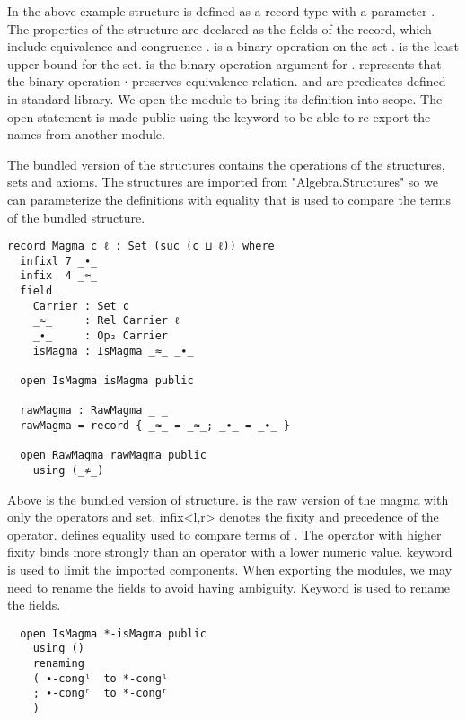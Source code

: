 In the above example structure  is defined as a record type with
a parameter . The properties of the structure  are
declared as the fields of the record, which include equivalence
 and congruence .  is a binary
operation on the set .  is the least upper bound for the
set.  is the binary operation argument for .
 represents that the binary operation ∙ preserves
equivalence relation.  and  are
predicates defined in standard library. We open the module
 to bring its definition into scope. The open statement is
made public using the keyword  to be able to re-export the names
from another module.

The bundled version of the structures contains the operations of the structures,
sets and axioms. The structures are imported from "Algebra.Structures" so we can
parameterize the definitions with equality that is used to compare the terms of
the bundled structure.

\begin{verbatim}
record Magma c ℓ : Set (suc (c ⊔ ℓ)) where
  infixl 7 _∙_
  infix  4 _≈_
  field
    Carrier : Set c
    _≈_     : Rel Carrier ℓ
    _∙_     : Op₂ Carrier
    isMagma : IsMagma _≈_ _∙_

  open IsMagma isMagma public

  rawMagma : RawMagma _ _
  rawMagma = record { _≈_ = _≈_; _∙_ = _∙_ }

  open RawMagma rawMagma public
    using (_≉_)
\end{verbatim}

Above is the bundled version of  structure.  is
the raw version of the magma with only the operators and set. infix<l,r> denotes
the fixity and precedence of the operator.  defines equality used to
compare terms of . The operator with higher fixity binds more
strongly than an operator with a lower numeric value.  keyword is
used to limit the imported components. When exporting the modules, we may need
to rename the fields to avoid having ambiguity. Keyword  is
used to rename the fields.

\label{code:rename}
\begin{verbatim}
  open IsMagma *-isMagma public
    using ()
    renaming
    ( ∙-congˡ  to *-congˡ
    ; ∙-congʳ  to *-congʳ
    )
\end{verbatim} 

